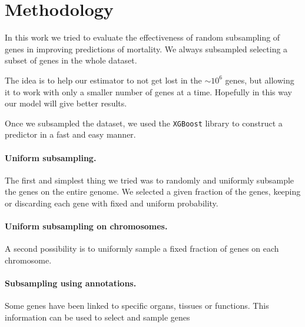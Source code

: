 \section{Methodology}
\label{sec:methods}

In this work we tried to evaluate the effectiveness of random subsampling of genes in improving predictions of mortality.
We always subsampled selecting a subset of genes in the whole dataset.

The idea is to help our estimator to not get lost in the $\sim 10^6$ genes, but allowing it to work with only a smaller number of genes at a time. Hopefully in this way our model will give better results.

Once we subsampled the dataset, we used the \texttt{XGBoost}\cite{xgboost} library to construct a predictor in a fast and easy manner. 

\paragraph{Uniform subsampling.}
The first and simplest thing we tried was to randomly and uniformly subsample the genes on the entire genome.
We selected a given fraction of the genes, keeping or discarding each gene with fixed and uniform probability.

\paragraph{Uniform subsampling on chromosomes.}
A second possibility is to uniformly sample a fixed fraction of genes on each chromosome.

\paragraph{Subsampling using annotations.}
Some genes have been linked to specific organs, tissues or functions. This information can be used to select and sample genes
